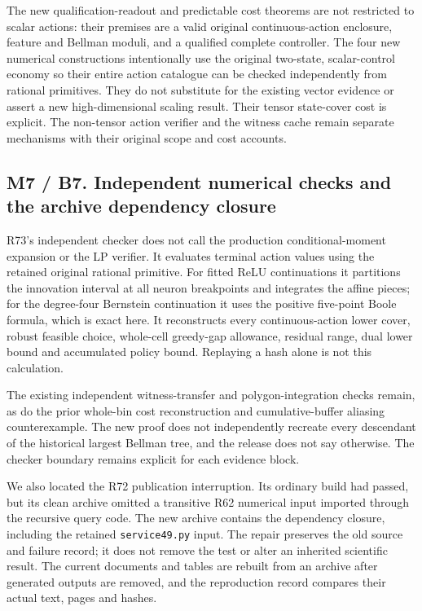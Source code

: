\documentclass[ecta,nameyear,draft]{econsocart}
\begin{document}
The new qualification-readout and predictable cost theorems are not
restricted to scalar actions: their premises are a valid original
continuous-action enclosure, feature and Bellman moduli, and a qualified
complete controller. The four new numerical constructions intentionally
use the original two-state, scalar-control economy so their entire
action catalogue can be checked independently from rational primitives.
They do not substitute for the existing vector evidence or assert a new
high-dimensional scaling result. Their tensor state-cover cost is
explicit. The non-tensor action verifier and the witness cache remain
separate mechanisms with their original scope and cost accounts.

\hypertarget{m7-b7.-independent-numerical-checks-and-the-archive-dependency-closure}{%
\subsection{M7 / B7. Independent numerical checks and the archive
dependency
closure}\label{m7-b7.-independent-numerical-checks-and-the-archive-dependency-closure}}

R73's independent checker does not call the production
conditional-moment expansion or the LP verifier. It evaluates terminal
action values using the retained original rational primitive. For fitted
ReLU continuations it partitions the innovation interval at all neuron
breakpoints and integrates the affine pieces; for the degree-four
Bernstein continuation it uses the positive five-point Boole formula,
which is exact here. It reconstructs every continuous-action lower
cover, robust feasible choice, whole-cell greedy-gap allowance, residual
range, dual lower bound and accumulated policy bound. Replaying a hash
alone is not this calculation.

The existing independent witness-transfer and polygon-integration checks
remain, as do the prior whole-bin cost reconstruction and
cumulative-buffer aliasing counterexample. The new proof does not
independently recreate every descendant of the historical largest
Bellman tree, and the release does not say otherwise. The checker
boundary remains explicit for each evidence block.

We also located the R72 publication interruption. Its ordinary build had
passed, but its clean archive omitted a transitive R62 numerical input
imported through the recursive query code. The new archive contains the
dependency closure, including the retained \nolinkurl{service49.py} input.
The repair preserves the old source and failure record; it does not
remove the test or alter an inherited scientific result. The current
documents and tables are rebuilt from an archive after generated outputs
are removed, and the reproduction record compares their actual text,
pages and hashes.
\end{document}
